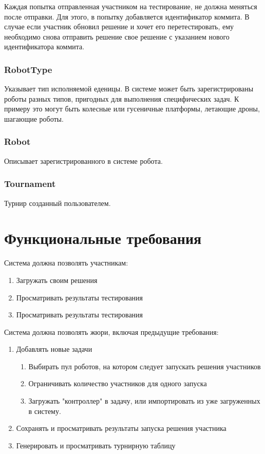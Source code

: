 \documentclass[a4paper,12pt]{article}
\begin{document}
Каждая попытка отправленная участником на тестирование, не должна меняться после отправки. Для этого, в попытку добавляется идентификатор коммита. В случае если участник обновил решение и хочет его перетестировать, ему необходимо снова отправить решение свое решение с указанием нового идентификатора коммита. 

\subsubsection{RobotType}
Указывает тип исполняемой еденицы. В системе может быть зарегистрированы роботы разных типов, пригодных для выполнения специфических задач. К примеру это могут быть колесные или гусеничные платформы, летающие дроны, шагающие роботы. 

\subsubsection{Robot}
Описывает зарегистрированного в системе робота.

\subsubsection{Tournament}
Турнир созданный пользователем.

\section{Функциональные требования}
Система должна позволять участникам:
\begin{enumerate}
    \item Загружать своим решения
    \item Просматривать результаты тестирования
    \item Просматривать результаты тестирования
\end{enumerate}
Система должна позволять жюри, включая предыдущие требования:
\begin{enumerate}
    \item Добавлять новые задачи
    \begin{enumerate}
        \item Выбирать пул роботов, на котором следует запускать решения участников
        \item Ограничивать количество участников для одного запуска
        \item Загружать "контроллер" в задачу, или импортировать из уже загруженных в систему.
    \end{enumerate}
    \item Сохранять и просматривать результаты запуска решения участника
    \item Генерировать и просматривать турнирную таблицу
\end{enumerate}
\end{document}
